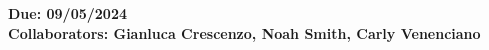 \documentclass[10pt]{mypackage}
\renewcommand*{\mathbb}[1]{\varmathbb{#1}}
\begin{document}
\begin{center}
  \bfseries
  Due: 09/05/2024\\

  Collaborators: Gianluca Crescenzo, Noah Smith, Carly Venenciano
\end{center}
\RaggedRight
%
\end{document}
